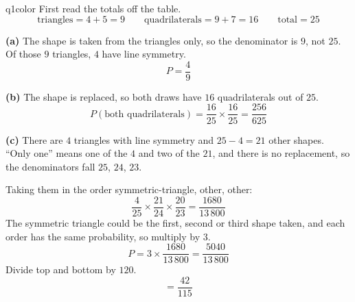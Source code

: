 \documentclass[11pt,a4paper]{article}
\begin{document}
\begin{ansbox}{q1color}
First read the totals off the table.
\[ \text{triangles} = 4 + 5 = 9 \qquad \text{quadrilaterals} = 9 + 7 = 16 \qquad \text{total} = 25 \]

\textbf{(a)} The shape is taken from the triangles only, so the denominator is $9$, not $25$. Of those $9$ triangles, $4$ have line symmetry.
\[ P = \frac{4}{9} \]

\textbf{(b)} The shape is replaced, so both draws have $16$ quadrilaterals out of $25$.
\[ P(\text{both quadrilaterals}) = \frac{16}{25} \times \frac{16}{25} = \frac{256}{625} \]

\textbf{(c)} There are $4$ triangles with line symmetry and $25 - 4 = 21$ other shapes. ``Only one'' means one of the $4$ and two of the $21$, and there is no replacement, so the denominators fall $25$, $24$, $23$.

Taking them in the order symmetric-triangle, other, other:
\[ \frac{4}{25} \times \frac{21}{24} \times \frac{20}{23} = \frac{1680}{13\,800} \]
The symmetric triangle could be the first, second or third shape taken, and each order has the same probability, so multiply by $3$.
\[ P = 3 \times \frac{1680}{13\,800} = \frac{5040}{13\,800} \]
Divide top and bottom by $120$.
\[ = \frac{42}{115} \]
\end{ansbox}
\end{document}
